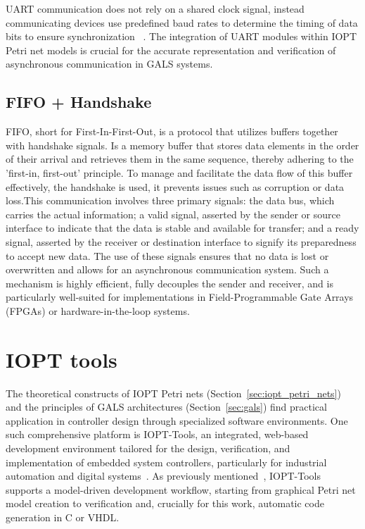 UART communication does not rely on a shared clock signal, instead communicating devices use predefined baud rates to determine the timing of data bits to ensure synchronization ~\cite{UARTard}.  The integration of UART modules within IOPT Petri net models is crucial for the accurate representation and verification of asynchronous communication in GALS systems. 




\subsection{FIFO + Handshake}
\label{sub:fifo+handshake}

FIFO, short for First-In-First-Out, is a protocol that utilizes buffers together with handshake signals. Is a memory buffer that stores data elements in the order of their arrival and retrieves them in the same sequence, thereby adhering to the 'first-in, first-out' principle. To manage and facilitate the data flow of this buffer effectively, the handshake is used, it prevents issues such as corruption or data loss.This communication involves three primary signals: the data bus, which carries the actual information; a valid signal, asserted by the sender or source interface to indicate that the data is stable and available for transfer; and a ready signal, asserted by the receiver or destination interface to signify its preparedness to accept new data. The use of these signals ensures that no data is lost or overwritten and allows for an asynchronous communication system. Such a mechanism is highly efficient, fully decouples the sender and receiver, and is particularly well-suited for implementations in Field-Programmable Gate Arrays (FPGAs) or hardware-in-the-loop systems.

\section{IOPT tools}
\label{sec:iopt_tools}



The theoretical constructs of IOPT Petri nets (Section~\ref{sec:iopt_petri_nets}) and the principles of GALS architectures (Section~\ref{sec:gals}) find practical application in controller design through specialized software environments. One such comprehensive platform is IOPT-Tools, an integrated, web-based development environment tailored for the design, verification, and implementation of embedded system controllers, particularly for industrial automation and digital systems~\cite{iopttools}. As previously mentioned~\cite{iopttools}, IOPT-Tools supports a model-driven development workflow, starting from graphical Petri net model creation to verification and, crucially for this work, automatic code generation in C or VHDL.

